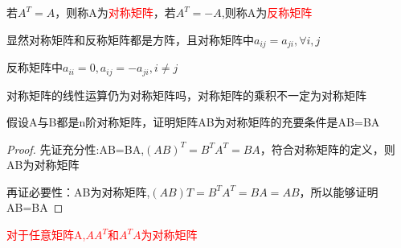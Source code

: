若$A^T=A$，则称A为\textcolor{red}{对称矩阵}，若$A^T=-A$,则称A为\textcolor{red}{反称矩阵}

显然对称矩阵和反称矩阵都是方阵，且对称矩阵中$a_{ij}=a_{ji},\forall  i,j$

反称矩阵中$a_{ii}=0,a_{ij}=-a_{ji},i\neq j$

对称矩阵的线性运算仍为对称矩阵吗，对称矩阵的乘积不一定为对称矩阵

\begin{question}
	假设A与B都是n阶对称矩阵，证明矩阵AB为对称矩阵的充要条件是AB=BA

	\begin{proof}
		先证充分性:AB=BA,$(AB)^T=B^TA^T=BA$，符合对称矩阵的定义，则AB为对称矩阵

		再证必要性：AB为对称矩阵,$(AB)T=B^TA^T=BA=AB$，所以能够证明AB=BA
	\end{proof}

	\textcolor{red}{对于任意矩阵A,$AA^T$和$A^TA$为对称矩阵}

\end{question}